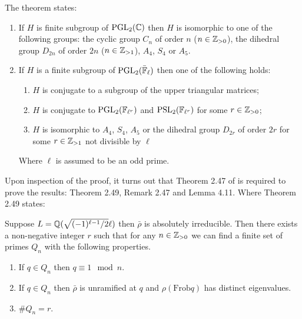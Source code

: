 The theorem states:

\begin{enumerate}
    \item If $H$ is finite subgroup of $\operatorname{PGL}_2(\mathbb{C})$ then $H$ is isomorphic to one of the following groups: the cyclic group $C_n$ of order $n$ ($n \in \mathbb{Z}_{>0}$), the dihedral group $D_{2n}$ of order $2n$ ($n \in \mathbb{Z}_{>1}$), $A_4$, $S_4$ or $A_5$.
\item If $H$ is a finite subgroup of $\operatorname{PGL}_2(\bar{\mathbb{F}}_\ell)$ then one of the following holds:
\begin{enumerate}
    \item $H$ is conjugate to a subgroup of the upper triangular matrices;
    \item $H$ is conjugate to $\operatorname{PGL}_2(\mathbb{F}_{\ell^r})$ and $\operatorname{PSL}_2(\mathbb{F}_{\ell^{r}})$ for some $r \in \mathbb{Z}_{>0}$;
    \item $H$ is isomorphic to $A_4$, $S_4$, $A_5$ or the dihedral group $D_{2r}$ of order $2r$ for some $r \in \mathbb{Z}_{>1}$ not divisible by $\ell$

\end{enumerate}
    Where $\ell$ is assumed to be an odd prime.
\end{enumerate}




Upon inspection of the proof, it turns out that Theorem 2.47 of \cite{dtt} is required to prove the results: Theorem 2.49, Remark 2.47 and Lemma 4.11. Where Theorem 2.49 states:

\begin{theorem}[Theorem 2.49]
    Suppose $L = \mathbb{Q}(\sqrt{(-1)^{\ell -1}/2} \ell)$ then $\bar{\rho}$ is absolutely irreducible. Then
    there exists a non-negative integer $r$ such that for any $n \in \mathbb{Z}_{>0}$ we can find a
    finite set of primes $Q_n$ with the following properties.
    \begin{enumerate}
        \item If $q \in Q_n$ then $q \equiv 1 \mod n$.
        \item If $q \in Q_n$ then $\bar{\rho}$ is unramified at $q$ and $\rho(\textrm{Frob}q)$ has distinct eigenvalues.
        \item $\# Q_n = r$.
    \end{enumerate}
\end{theorem}

